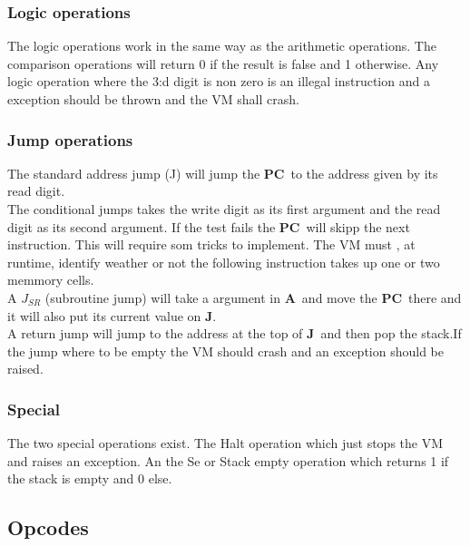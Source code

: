 \documentclass{article}
\newcommand{\A}{$\textbf{A}$}
\newcommand{\pc}{$\textbf{PC}$}
\newcommand{\J}{$\textbf{J}$}
\begin{document}
\subsubsection{Logic operations}
The logic operations work in the same way as the arithmetic operations. The
comparison operations will return 0 if the result is false and 1 otherwise.
Any logic operation where the 3:d digit is non zero is an illegal instruction
and a exception should be thrown and the VM shall crash.

\subsubsection{Jump operations}
The standard address jump (J) will jump the \pc \ to the address given by its
read digit.\\
The conditional jumps takes the write digit as its first argument and the read
digit as its second argument. If the test fails the \pc \ will skipp the next
instruction. This will require som tricks to implement. The VM must , at
runtime, identify weather or not the following instruction takes up one or two
memmory cells.\\

A $J_{SR}$ (subroutine jump) will take a argument in \A \ and move the \pc \
there and it will also put its current value on \J.\\
A return jump will jump to the address at the top of \J \ and then pop the
stack.If the jump where to be empty the VM should crash and an exception
should be raised.\\


\subsubsection{Special}
The two special operations exist. The Halt operation which just stops the VM and
raises an exception.
An the Se or Stack empty operation which returns 1 if the stack is empty and 0
else.

\subsection{Opcodes}
\end{document}
